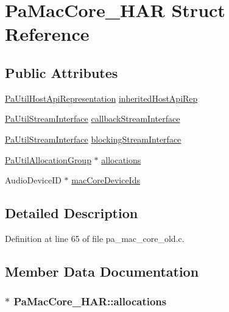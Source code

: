 \hypertarget{struct_pa_mac_core___h_a_r}{}\section{Pa\+Mac\+Core\+\_\+\+H\+AR Struct Reference}
\label{struct_pa_mac_core___h_a_r}
\subsection*{Public Attributes}
\begin{DoxyCompactItemize}
\item 
\hyperlink{struct_pa_util_host_api_representation}{Pa\+Util\+Host\+Api\+Representation} \hyperlink{struct_pa_mac_core___h_a_r_aa628d92258f125f298fac3557a1f6422}{inherited\+Host\+Api\+Rep}
\item 
\hyperlink{struct_pa_util_stream_interface}{Pa\+Util\+Stream\+Interface} \hyperlink{struct_pa_mac_core___h_a_r_a36c85c2db2c58861bff2c32a71e4112d}{callback\+Stream\+Interface}
\item 
\hyperlink{struct_pa_util_stream_interface}{Pa\+Util\+Stream\+Interface} \hyperlink{struct_pa_mac_core___h_a_r_a1a7760276b65bef8508468c46bcebdee}{blocking\+Stream\+Interface}
\item 
\hyperlink{struct_pa_util_allocation_group}{Pa\+Util\+Allocation\+Group} $\ast$ \hyperlink{struct_pa_mac_core___h_a_r_a912e87ec812b17f77d8cf85b6243753b}{allocations}
\item 
Audio\+Device\+ID $\ast$ \hyperlink{struct_pa_mac_core___h_a_r_a29ebbcbe4bcf4f59e1b105a9f288abdb}{mac\+Core\+Device\+Ids}
\end{DoxyCompactItemize}


\subsection{Detailed Description}


Definition at line 65 of file pa\+\_\+mac\+\_\+core\+\_\+old.\+c.



\subsection{Member Data Documentation}
\subsubsection[{\texorpdfstring{allocations}{allocations}}]{$\ast$ Pa\+Mac\+Core\+\_\+\+H\+A\+R\+::allocations}\hypertarget{struct_pa_mac_core___h_a_r_a912e87ec812b17f77d8cf85b6243753b}{}\label{struct_pa_mac_core___h_a_r_a912e87ec812b17f77d8cf85b6243753b}


